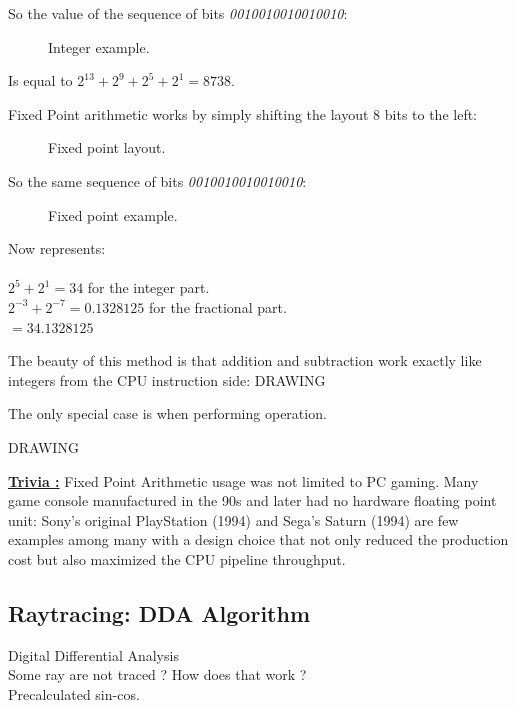 So the value of the sequence of bits \emph{0010010010010010}:
\begin{figure}[H]
\centering

 \caption{Integer example.} \label{fig:mips}
 \end{figure}

 Is equal to $ 2^{13} + 2^9 + 2^5 + 2^1 =  8738 $.

\bigskip


Fixed Point arithmetic works by simply shifting the layout 8 bits to the left:
\begin{figure}[H]
 \centering
  
 \caption{Fixed point layout.} \label{fig:mips}
\end{figure}

So the same sequence of bits \emph{0010010010010010}:
\begin{figure}[H]
 \centering
   
  \caption{Fixed point example.} \label{fig:mips}
\end{figure} 

Now represents:\\
\\
$ 2^5 + 2^1 = 34 $ for the integer part.\\
$ 2^{-3}+2^{-7} = 0.1328125 $ for the fractional part.\\
$ = 34.1328125$\\

\bigskip

The beauty of this method is that addition and subtraction work exactly like integers from the CPU instruction side:
  \bigskip
  DRAWING
  \bigskip


 The only special case is when performing operation.

\bigskip
  DRAWING
  \bigskip



 \textbf{\underline{Trivia :}}  Fixed Point Arithmetic usage was not limited to PC gaming. Many game console manufactured in the 90s and later had no hardware floating point unit: Sony's original PlayStation (1994) and Sega's Saturn (1994) are few examples among many with a design choice that not only reduced the production cost but also maximized the CPU pipeline throughput.
 
 
 
 
 
 
 
 
 
 
 
 
 
\subsection{Raytracing: DDA Algorithm}
Digital Differential Analysis\\
Some ray are not traced ? How does that work ?\\
Precalculated sin-cos.\\
